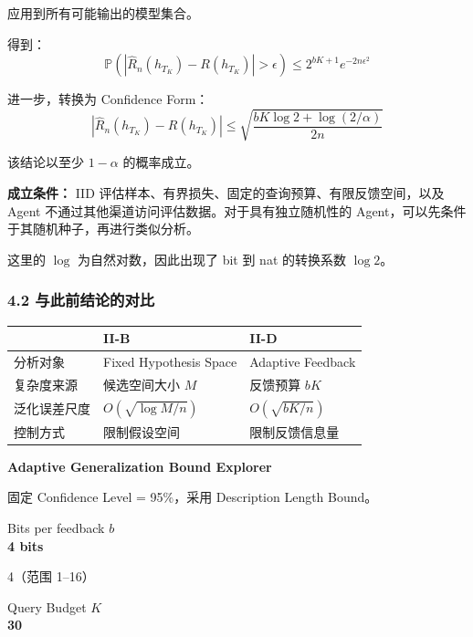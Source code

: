 应用到所有可能输出的模型集合。

得到：
\[\boxed{
\mathbb P
\left(
|\widehat R_n(h_{T_K})-R(h_{T_K})|
>\epsilon
\right)
\leq
2^{bK+1}e^{-2n\epsilon^2}
}\]

进一步，转换为 Confidence Form：
\[\boxed{
|\widehat R_n(h_{T_K})-R(h_{T_K})|
\leq
\sqrt{
\frac{bK\log 2+\log(2/\alpha)}{2n}
}
}\]

该结论以至少 \(1-\alpha\) 的概率成立。

\textbf{成立条件：} IID 评估样本、有界损失、固定的查询预算、有限反馈空间，以及 Agent 不通过其他渠道访问评估数据。对于具有独立随机性的 Agent，可以先条件于其随机种子，再进行类似分析。

这里的 \(\log\) 为自然对数，因此出现了 bit 到 nat 的转换系数 \(\log 2\)。

\hypertarget{part-2-20-0001-ux4e0eux6b64ux524dux7ed3ux8bbaux7684ux5bf9ux6bd4}{%
\subsubsection{4.2 与此前结论的对比}\label{part-2-20-0001-ux4e0eux6b64ux524dux7ed3ux8bbaux7684ux5bf9ux6bd4}}

\begin{readertable}
\begin{longtable}[]{@{}
  >{\raggedright\arraybackslash}p{}
  >{\raggedright\arraybackslash}p{}
  >{\raggedright\arraybackslash}p{}@{}}
\toprule
& II-B & II-D \\
\midrule
\endhead
分析对象 & Fixed Hypothesis Space & Adaptive Feedback \\
复杂度来源 & 候选空间大小 \(M\) & 反馈预算 \(bK\) \\
泛化误差尺度 & \(O(\sqrt{\log M/n})\) & \(O(\sqrt{bK/n})\) \\
控制方式 & 限制假设空间 & 限制反馈信息量 \\
\bottomrule
\end{longtable}
\end{readertable}

\textbf{Adaptive Generalization Bound Explorer}

固定 Confidence Level = 95\%，采用 Description Length Bound。

Bits per feedback \(b\)\\
\textbf{4 bits}

4（范围 1--16）

Query Budget \(K\)\\
\textbf{30}

